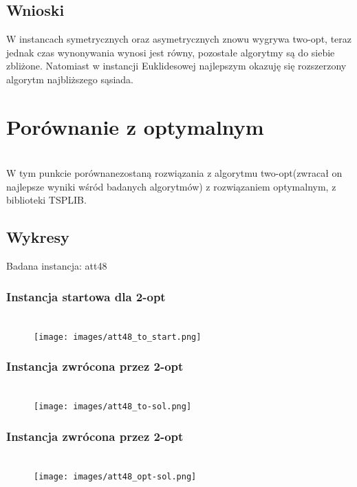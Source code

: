 \documentclass[11pt]{article}
\begin{document}
\subsection{Wnioski }
W instancach symetrycznych oraz asymetrycznych znowu wygrywa two-opt, teraz jednak czas wynonywania wynosi jest równy, pozostałe algorytmy są do siebie zbliżone. Natomiast w instancji Euklidesowej najlepszym okazuję się rozszerzony algorytm najbliższego sąsiada.
\section{Porównanie z optymalnym }
\\W tym punkcie porównanezostaną rozwiązania z algorytmu two-opt(zwracał on najlepsze wyniki wśród badanych algorytmów) z rozwiązaniem optymalnym, z biblioteki TSPLIB.
\subsection{Wykresy}
Badana instancja: att48
\subsubsection{Instancja startowa dla 2-opt }
            \begin{center}
            \begin{figure}[H]

                \\ \texttt{[image: images/att48\_to\_start.png]}\

            \end{figure}
            \end{center}

\subsubsection{Instancja zwrócona przez 2-opt }
            \begin{center}
            \begin{figure}[H]

                \\ \texttt{[image: images/att48\_to-sol.png]}\

            \end{figure}
            \end{center}
\subsubsection{Instancja zwrócona przez 2-opt }
            \begin{center}
            \begin{figure}[H]
                \\ \texttt{[image: images/att48\_opt-sol.png]}\
            \end{figure}
            \end{center}
\end{document}
